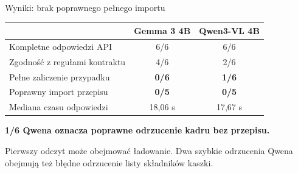 \documentclass[aspectratio=169,11pt]{beamer}
\begin{document}
\begin{frame}{Wyniki: brak poprawnego pełnego importu}
  \begin{center}
    \renewcommand{\arraystretch}{1.15}
    \begin{tabular}{@{}lcc@{}}
      \toprule
      & \textbf{Gemma 3 4B} & \textbf{Qwen3-VL 4B} \\
      \midrule
      Kompletne odpowiedzi API & 6/6 & 6/6 \\
      Zgodność z regułami kontraktu & 4/6 & 2/6 \\
      Pełne zaliczenie przypadku & \alert{\textbf{0/6}} & \alert{\textbf{1/6}} \\
      Poprawny import przepisu & \alert{\textbf{0/5}} & \alert{\textbf{0/5}} \\
      Mediana czasu odpowiedzi & 18,06 s & 17,67 s \\
      \bottomrule
    \end{tabular}
  \end{center}
  \vspace{0.1cm}
  \textbf{1/6 Qwena oznacza poprawne odrzucenie kadru bez przepisu.}
  \par{\small Pierwszy odczyt może obejmować ładowanie. Dwa szybkie odrzucenia Qwena obejmują też błędne odrzucenie listy składników kaszki.}
\end{frame}
\end{document}
